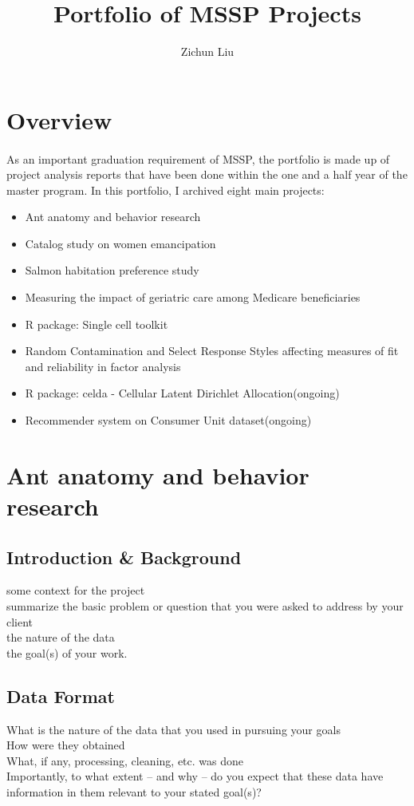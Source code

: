 \documentclass{article}
\title{Portfolio of MSSP Projects}
\author{Zichun Liu}
\begin{document}
	\maketitle
	\section{Overview}
	\paragraph{} As an important graduation requirement of MSSP, the portfolio is made up of project analysis reports that have been done within the one and a half year of the master program. In this portfolio, I archived eight main projects:
	\begin{itemize}
		\item Ant anatomy and behavior research
		\item Catalog study on women emancipation
		\item Salmon habitation preference study
		\item Measuring the impact of geriatric care among Medicare beneficiaries
		\item R package: Single cell toolkit
		\item Random Contamination and Select Response Styles affecting measures of fit and reliability in factor analysis
		\item R package: celda - Cellular Latent Dirichlet Allocation(ongoing)
		\item Recommender system on Consumer Unit dataset(ongoing)		
	\end{itemize}

	\section{Ant anatomy and behavior research}
	\subsection{Introduction \& Background}
	some context for the project\\
	summarize the basic problem or question that you were asked to address by your client\\
	the nature of the data\\ 
	the goal(s) of your work.
	\subsection{Data Format}
	What is the nature of the data that you used in pursuing your goals\\
	How were they obtained\\
	What, if any, processing, cleaning, etc. was done\\
	Importantly, to what extent – and why – do you expect that these data have information in them relevant to your stated goal(s)?\\
\end{document}
